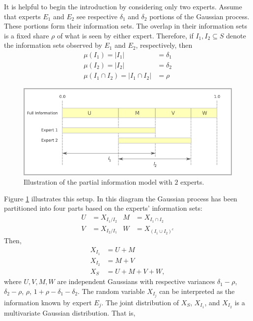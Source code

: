 \documentclass[11pt]{article}
\theoremstyle{definition}
\theoremstyle{definition}
\begin{document}
It is helpful to begin the introduction by considering only two experts. Assume that experts $E_1$ and $E_2$ see respective $\delta_1$ and $\delta_2$ portions of the Gaussian process. These portions form their information sets. The overlap in their information sets is a fixed share $\rho$ of what is seen by either expert. Therefore, if $I_1, I_2 \subseteq S$ denote the information sets observed by $E_1$ and $E_2$, respectively, then
\begin{align*}
\mu(I_1) = |I_1| &= \delta_1\\
\mu(I_2) = |I_2| &= \delta_2\\
\mu(I_1 \cap I_2) =  |I_1 \cap I_2| &= \rho
\end{align*}
\begin{figure}[htbp]
   \includegraphics[width = \textwidth]{N=2} %
   \caption{Illustration of the partial information model with $2$ experts.}
   \label{diagram2}
\end{figure}
Figure \ref{diagram2} illustrates this setup. In this diagram the Gaussian process has been partitioned into four parts based on the experts' information sets:
\begin{align*}
 U &= X_{I_1 / I_2}
& M &= X_{I_1 \cap I_2}\\
 V &= X_{I_2 / I_1}
& W &= X_{(I_1 \cup I_2)^c}
\end{align*}
Then,
\begin{align*}
X_{I_1} &= U + M\\
X_{I_2} &= M + V\\
X_S &= U+M+V+W,
\end{align*}
where $U, V, M, W$ are independent Gaussians with respective variances $\delta_1-\rho$, $\delta_2-\rho$, $\rho$, $1+\rho-\delta_1 - \delta_2$. The random variable $X_{I_j}$ can be interpreted as the information known by expert $E_j$. The joint distribution of $X_{S}$, $X_{I_1}$, and $X_{I_2}$ is a multivariate Gaussian distribution. That is,
\end{document}
